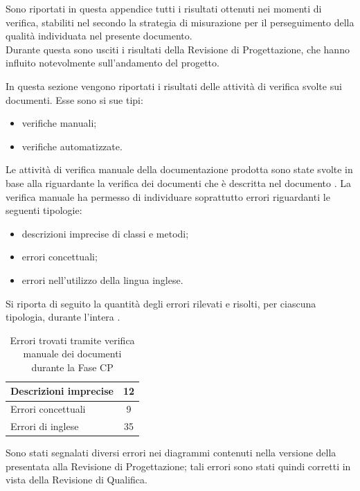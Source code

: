 
Sono riportati in questa appendice tutti i risultati ottenuti nei momenti di verifica, stabiliti nel  secondo la strategia di misurazione per il perseguimento della qualità individuata nel presente documento.\\
Durante questa  sono usciti i risultati della Revisione di Progettazione, che hanno influito notevolmente sull'andamento del progetto.

In questa sezione vengono riportati i risultati delle attività di verifica svolte sui documenti. Esse sono si sue tipi:
\begin{itemize}
\item verifiche manuali;
\item verifiche automatizzate.
\end{itemize}
Le attività di verifica manuale della documentazione prodotta sono state svolte in base alla  riguardante la verifica dei documenti che è descritta nel documento .
La verifica manuale ha permesso di individuare soprattutto errori riguardanti le seguenti tipologie:
\begin{itemize}
\item descrizioni imprecise di classi e metodi;
\item errori concettuali;
\item errori nell'utilizzo della lingua inglese.
\end{itemize}
Si riporta di seguito la quantità degli errori rilevati e risolti, per ciascuna tipologia, durante l'intera .
\begin{table}[H]
	\centering
		\begin{tabu}{| l | c |}
			\hline
				Descrizioni imprecise	&	12\\ \hline
				Errori concettuali	&	9\\ \hline
				Errori di inglese  &  35\\ \hline
		\end{tabu}
		\caption{Errori trovati tramite verifica manuale dei documenti durante la Fase CP}
\end{table}

Sono stati segnalati diversi errori nei diagrammi  contenuti nella versione della  presentata alla Revisione di Progettazione; tali errori sono stati quindi corretti in vista della Revisione di Qualifica.

